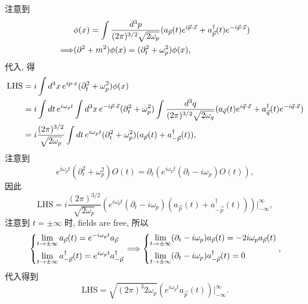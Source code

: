\begin{itemize}
	\begin{tcolorbox}[title=proof:]
		注意到
		\begin{align}
			& \phi(x) = \int \frac{d^3 p}{(2 \pi)^{3 / 2} \sqrt{2 \omega_p}} (a_{\vec{p}}(t) e^{i \vec{p} \cdot \vec{x}} + a^\dag_{\vec{p}}(t) e^{- i \vec{p} \cdot \vec{x}}) \notag \\
			\Longrightarrow & (\partial^2 + m^2) \phi(x) = (\partial_t^2 + \omega_p^2) \phi(x),
		\end{align}
		代入, 得
		\begin{align}
			\text{LHS} &= i \int d^4 x \, e^{i p \cdot x} (\partial_t^2 + \omega_p^2) \phi(x) \notag \\
			&= i \int dt \, e^{i \omega_p t} \int d^3 x \, e^{- i \vec{p} \cdot \vec{x}} (\partial_t^2 + \omega_p^2) \int \frac{d^3 q}{(2 \pi)^{3 / 2} \sqrt{2 \omega_q}} (a_{\vec{q}}(t) e^{i \vec{q} \cdot \vec{x}} + a^\dag_{\vec{q}}(t) e^{- i \vec{q} \cdot \vec{x}}) \notag \\
			&= i \frac{(2 \pi)^{3 / 2}}{\sqrt{2 \omega_p}} \int dt \, e^{i \omega_p t} (\partial_t^2 + \omega_p^2) (a_{\vec{p}}(t) + a^\dag_{- \vec{p}}(t)),
		\end{align}
		注意到
		\begin{equation}
			e^{i \omega_p t} (\partial_t^2 + \omega_p^2) O(t) = \partial_t(e^{i \omega_p t} (\partial_t - i \omega_p) O(t)),
		\end{equation}
		因此
		\begin{equation}
			\text{LHS} = i \frac{(2 \pi)^{3 / 2}}{\sqrt{2 \omega_p}} (e^{i \omega_p t} (\partial_t - i \omega_p) (a_{\vec{p}}(t) + a^\dag_{- \vec{p}}(t))) \Big|^\infty_{- \infty},
		\end{equation}
		注意到 $t = \pm \infty$ 时, fields are free, 所以
		\begin{equation}
			\begin{dcases}
				\lim_{t \rightarrow \pm \infty} a_{\vec{p}}(t) = e^{- i \omega_p t} a_{\vec{p}} \\
				\lim_{t \rightarrow \pm \infty} a^\dag_{- \vec{p}}(t) = e^{i \omega_p t} a^\dag_{- \vec{p}}
			\end{dcases} \Longrightarrow \begin{dcases}
				\lim_{t \rightarrow \pm \infty} (\partial_t - i \omega_p) a_{\vec{p}}(t) = - 2 i \omega_p a_{\vec{p}}(t) \\
				\lim_{t \rightarrow \pm \infty} (\partial_t - i \omega_p) a^\dag_{- \vec{p}}(t) = 0
			\end{dcases},
		\end{equation}
		代入得到
		\begin{equation}
			\text{LHS} = \sqrt{(2 \pi)^3 2 \omega_p} (e^{i \omega_p t} a_{\vec{p}}(t)) \Big|^\infty_{- \infty}.
		\end{equation}
	\end{tcolorbox}
	

\end{itemize}
